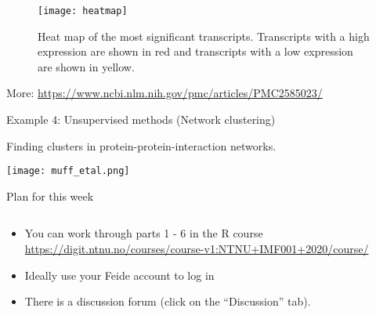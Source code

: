 \documentclass[10pt,ignorenonframetext,]{beamer}
\providecommand{\tightlist}{%
  \setlength{\itemsep}{0pt}\setlength{\parskip}{0pt}}
\begin{document}
\begin{frame}

\begin{figure}
\texttt{[image: heatmap]} \caption{Heat map of the most significant transcripts. Transcripts with a high expression are shown in red and transcripts with a low expression are shown in yellow.}\label{fig:heatmap_pic}
\end{figure}

\tiny

More: \url{https://www.ncbi.nlm.nih.gov/pmc/articles/PMC2585023/}

\end{frame}

\begin{frame}{Example 4: Unsupervised methods (Network clustering)}
\protect\hypertarget{example-4-unsupervised-methods-network-clustering}{}

\vspace{2mm}

Finding clusters in protein-protein-interaction networks. \vspace{2mm}

\texttt{[image: muff\_etal.png]}

\end{frame}

\begin{frame}{Plan for this week}
\protect\hypertarget{plan-for-this-week}{}

\(~\)

\begin{itemize}
\tightlist
\item
  You can work through parts 1 - 6 in the R course
  \url{https://digit.ntnu.no/courses/course-v1:NTNU+IMF001+2020/course/}
\end{itemize}

\vspace{2mm}

\begin{itemize}
\tightlist
\item
  Ideally use your Feide account to log in
\end{itemize}

\vspace{2mm}

\begin{itemize}
\tightlist
\item
  There is a discussion forum (click on the ``Discussion'' tab).
\end{itemize}

\end{frame}
\end{document}
